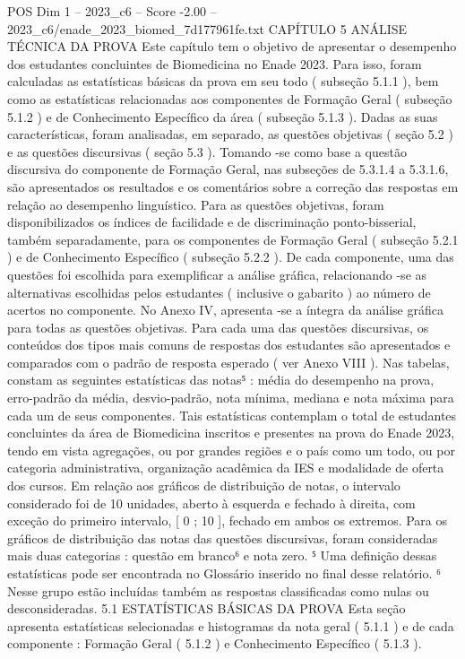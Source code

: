 \begin{textsample}{POS Dim 1 – 2023\_c6 – Score -2.00 – 2023\_c6/enade\_2023\_biomed\_7d177961fe.txt}  \label{ex:f1_pos_240}
CAPÍTULO 5 ANÁLISE TÉCNICA DA PROVA Este capítulo tem o objetivo de apresentar o desempenho dos estudantes concluintes de Biomedicina no Enade 2023.
Para isso, foram calculadas as estatísticas básicas da prova em seu todo ( subseção 5.1.1 ), bem como as estatísticas relacionadas aos componentes de Formação Geral ( subseção 5.1.2 ) e de Conhecimento Específico da área ( subseção 5.1.3 ).
Dadas as suas características, foram analisadas, em separado, as questões objetivas ( seção 5.2 ) e as questões discursivas ( seção 5.3 ).
Tomando -se como base a questão discursiva do componente de Formação Geral, nas subseções de 5.3.1.4 a 5.3.1.6, são apresentados os resultados e os comentários sobre a correção das respostas em relação ao desempenho linguístico.
Para as questões objetivas, foram disponibilizados os índices de facilidade e de discriminação ponto-bisserial, também separadamente, para os componentes de Formação Geral ( subseção 5.2.1 ) e de Conhecimento Específico ( subseção 5.2.2 ).
De cada componente, uma das questões foi escolhida para exemplificar a análise gráfica, relacionando -se as alternativas escolhidas pelos estudantes ( inclusive o gabarito ) ao número de acertos no componente.
No Anexo IV, apresenta -se a íntegra da análise gráfica para todas as questões objetivas.
Para cada uma das questões discursivas, os conteúdos dos tipos mais comuns de respostas dos estudantes são apresentados e comparados com o padrão de resposta esperado ( ver Anexo VIII ).
Nas tabelas, constam as seguintes estatísticas das notas⁵ : média do desempenho na prova, erro-padrão da média, desvio-padrão, nota mínima, mediana e nota máxima para cada um de seus componentes.
Tais estatísticas contemplam o total de estudantes concluintes da área de Biomedicina inscritos e presentes na prova do Enade 2023, tendo em vista agregações, ou por grandes regiões e o país como um todo, ou por categoria administrativa, organização acadêmica da IES e modalidade de oferta dos cursos.
Em relação aos gráficos de distribuição de notas, o intervalo considerado foi de 10 unidades, aberto à esquerda e fechado à direita, com exceção do primeiro intervalo, [ 0 ; 10 ], fechado em ambos os extremos.
Para os gráficos de distribuição das notas das questões discursivas, foram consideradas mais duas categorias : questão em branco⁶ e nota zero. ⁵ Uma definição dessas estatísticas pode ser encontrada no Glossário inserido no final desse relatório. ⁶ Nesse grupo estão incluídas também as respostas classificadas como nulas ou desconsideradas. 5.1 ESTATÍSTICAS BÁSICAS DA PROVA Esta seção apresenta estatísticas selecionadas e histogramas da nota geral ( 5.1.1 ) e de cada componente : Formação Geral ( 5.1.2 ) e Conhecimento Específico ( 5.1.3 ).

\end{textsample}
